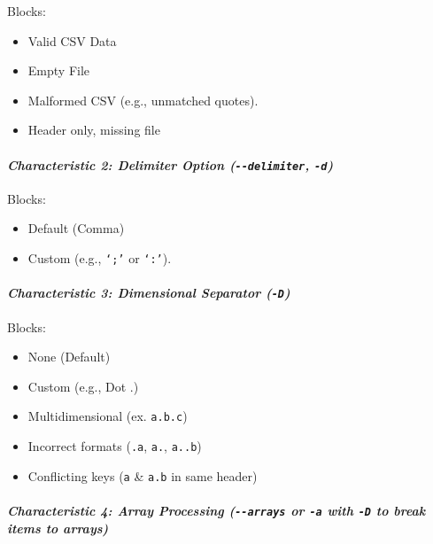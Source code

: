 \documentclass[
]{article}
\begin{document}
Blocks:
\begin{itemize}
  \item Valid CSV Data
  \item Empty File
  \item Malformed CSV (e.g., unmatched
  quotes).
  \item Header only, missing file
\end{itemize}
\paragraph{\texorpdfstring{\emph{Characteristic 2: Delimiter Option
(\texttt{-\/-delimiter},
\texttt{-d})}}{Characteristic 2: Delimiter Option (-\/-delimiter,
\itemd)}}\label{characteristic-2-delimiter-option---delimiter--d}

Blocks:
\begin{itemize}
\item Default (Comma)
\item Custom (e.g., \texttt{‘;’} or \texttt{‘:’}).
\end{itemize}

\paragraph{\texorpdfstring{\emph{Characteristic 3: Dimensional Separator
(\texttt{-D})}}{Characteristic 3: Dimensional Separator (-D)}}\label{characteristic-3-dimensional-separator--d}

Blocks:
\begin{itemize}
  \item None (Default)
  \item Custom (e.g., Dot .)
  \item Multidimensional (ex. \texttt{a.b.c})
  \item Incorrect formats (\texttt{.a}, \texttt{a.}, \texttt{a..b})
  \item Conflicting keys (\texttt{a} \& \texttt{a.b} in same header)
\end{itemize}

\paragraph{\texorpdfstring{\emph{Characteristic 4: Array Processing
(\texttt{-\/-arrays} or \texttt{-a} with \texttt{-D} to break items to
arrays)}}{Characteristic 4: Array Processing (-\/-arrays or
\itema with
\itemD to break items to arrays)}}\label{characteristic-4-array-processing---arrays-or--a-with--d-to-break-items-to-arrays}
\end{document}
